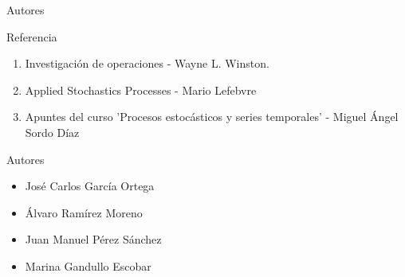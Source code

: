 \begin{frame}
	\centering \LARGE \color{naranjaUCA} Autores
\end{frame}
\begin{frame}
\begin{block}{Referencia}
	\begin{enumerate}
		\item Investigación de operaciones - Wayne L. Winston.
		\item Applied Stochastics Processes - Mario Lefebvre
		\item Apuntes del curso 'Procesos estocásticos y series temporales' - Miguel Ángel Sordo Díaz
	\end{enumerate}
\end{block}
\begin{block}{Autores}
	\begin{itemize}
		\item José Carlos García Ortega
		\item Álvaro Ramírez Moreno
		\item Juan Manuel Pérez Sánchez
		\item Marina Gandullo Escobar
	\end{itemize}
\end{block}
\end{frame}